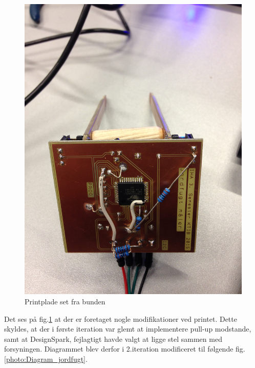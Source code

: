 \begin{figure}[H]
	\centering 
	\includegraphics[scale=0.1]{HardwareArkitektur/Sensore/Jordfugt_billeder/Print_2.jpg}
	\caption{Printplade set fra bunden}
	\label{photo:Print_2}
\end{figure} 

Det ses på fig.\ref{photo:Print_2} at der er foretaget nogle modifikationer ved printet. Dette skyldes, at der i første iteration var glemt at implementere pull-up modstande, samt at DesignSpark, fejlagtigt havde valgt at ligge stel sammen med forsyningen. 
Diagrammet blev derfor i 2.iteration modificeret til følgende fig.\ref{photo:Diagram_jordfugt}.

